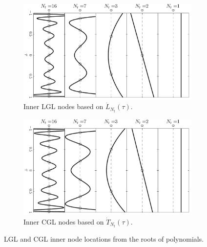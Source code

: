 \noindent\begin{figure}[!h]
\centering
\begin{subfigure}[b]{0.45\textwidth}
\begin{center}
\includegraphics[height=0.25\textheight,angle=90]{../app3/figures/LGLpoly}
\caption{Inner LGL nodes based on $\dot{L}_{N_t}(\tau)$. \label{fig:LGLpoly}}
\end{center}
\end{subfigure}%
\begin{subfigure}[b]{0.45\textwidth}
\begin{center}
\includegraphics[height=0.25\textheight,angle=90]{../app3/figures/CGLpoly}
\caption{Inner CGL nodes based on $\dot{T}_{N_t}(\tau)$. \label{fig:CGLpoly}}
\end{center}
\end{subfigure}

\caption[LGL and CGL inner node locations from the roots of polynomials]{LGL and CGL inner node locations from the roots of polynomials. \label{fig:node-compare}}
\end{figure}

